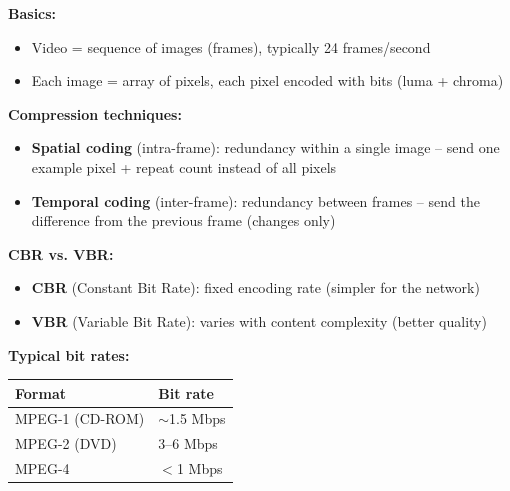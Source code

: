 \begin{tcolorbox}[keybox, title=Video -- Digitization and compression]
\textbf{Basics:}
\begin{itemize}[nosep]
  \item Video = sequence of images (frames), typically 24 frames/second
  \item Each image = array of pixels, each pixel encoded with bits (luma + chroma)
\end{itemize}

\medskip
\textbf{Compression techniques:}
\begin{itemize}[nosep]
  \item \textbf{Spatial coding} (intra-frame): redundancy within a single image -- send one example pixel + repeat count instead of all pixels
  \item \textbf{Temporal coding} (inter-frame): redundancy between frames -- send the difference from the previous frame (changes only)
\end{itemize}

\medskip
\textbf{CBR vs. VBR:}
\begin{itemize}[nosep]
  \item \textbf{CBR} (Constant Bit Rate): fixed encoding rate (simpler for the network)
  \item \textbf{VBR} (Variable Bit Rate): varies with content complexity (better quality)
\end{itemize}

\medskip
\textbf{Typical bit rates:}
\begin{center}
\begin{tabular}{ll}
\toprule
\textbf{Format} & \textbf{Bit rate} \\
\midrule
MPEG-1 (CD-ROM) & $\sim$1.5 Mbps \\
MPEG-2 (DVD) & 3--6 Mbps \\
MPEG-4 & $<$1 Mbps \\
\bottomrule
\end{tabular}
\end{center}
\end{tcolorbox}

